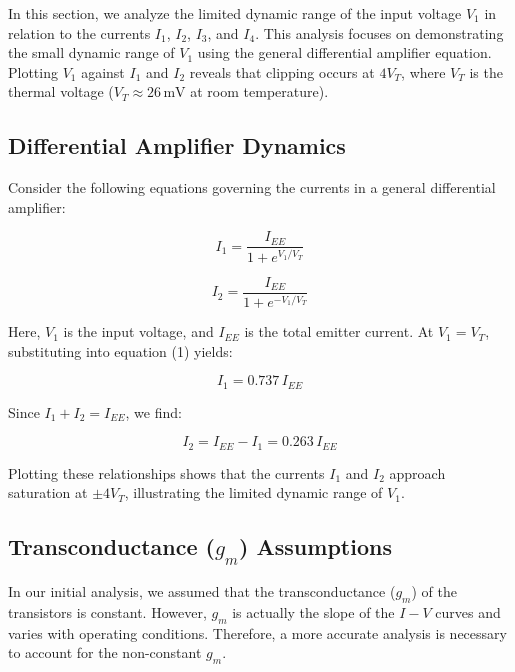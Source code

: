 \documentclass[a4paper,9pt,twoside,openany,twocolumn]{memoir}
\begin{document}
In this section, we analyze the limited dynamic range of the input voltage \( V_1 \) in relation to the currents \( I_1 \), \( I_2 \), \( I_3 \), and \( I_4 \). This analysis focuses on demonstrating the small dynamic range of \( V_1 \) using the general differential amplifier equation. Plotting \( V_1 \) against \( I_1 \) and \( I_2 \) reveals that clipping occurs at \( 4V_T \), where \( V_T \) is the thermal voltage (\( V_T \approx 26\,\text{mV} \) at room temperature).

\subsection{Differential Amplifier Dynamics}

Consider the following equations governing the currents in a general differential amplifier:

\begin{equation}
I_1 = \frac{I_{EE}}{1 + e^{V_1/V_T}}
\end{equation}

\begin{equation}
I_2 = \frac{I_{EE}}{1 + e^{-V_1/V_T}}
\end{equation}

Here, \( V_1 \) is the input voltage, and \( I_{EE} \) is the total emitter current. At \( V_1 = V_T \), substituting into equation (1) yields:

\begin{equation}
I_1 = 0.737\,I_{EE}
\end{equation}

Since \( I_1 + I_2 = I_{EE} \), we find:

\begin{equation}
I_2 = I_{EE} - I_1 = 0.263\,I_{EE}
\end{equation}

Plotting these relationships shows that the currents \( I_1 \) and \( I_2 \) approach saturation at \( \pm 4V_T \), illustrating the limited dynamic range of \( V_1 \).

\subsection{Transconductance (\( g_m \)) Assumptions}

In our initial analysis, we assumed that the transconductance (\( g_m \)) of the transistors is constant. However, \( g_m \) is actually the slope of the \( I-V \) curves and varies with operating conditions. Therefore, a more accurate analysis is necessary to account for the non-constant \( g_m \).
\end{document}
